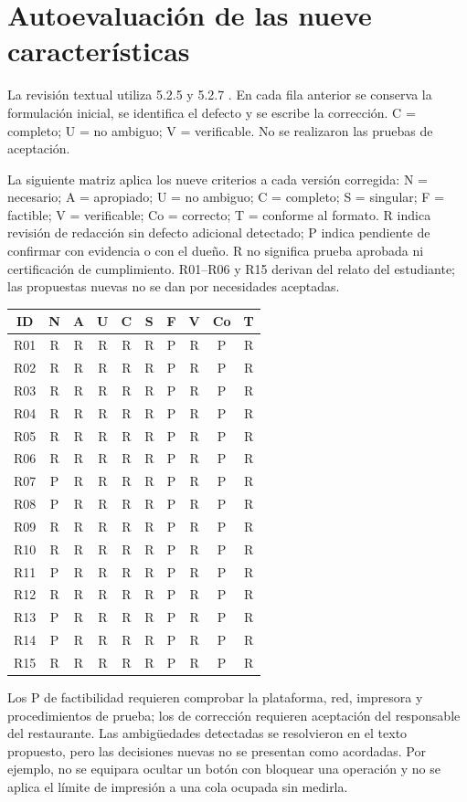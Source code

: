 \documentclass[11pt,a4paper]{article}
\begin{document}
\clearpage
\section{Autoevaluación de las nueve características}
La revisión textual utiliza 5.2.5 y 5.2.7 \cite{iso29148}. En cada fila anterior se conserva la formulación inicial, se identifica el defecto y se escribe la corrección. C = completo; U = no ambiguo; V = verificable. No se realizaron las pruebas de aceptación.

La siguiente matriz aplica los nueve criterios a cada versión corregida: N = necesario; A = apropiado; U = no ambiguo; C = completo; S = singular; F = factible; V = verificable; Co = correcto; T = conforme al formato. R indica revisión de redacción sin defecto adicional detectado; P indica pendiente de confirmar con evidencia o con el dueño. R no significa prueba aprobada ni certificación de cumplimiento. R01--R06 y R15 derivan del relato del estudiante; las propuestas nuevas no se dan por necesidades aceptadas.
\begingroup\scriptsize
\begin{longtable}{|c|c|c|c|c|c|c|c|c|c|}
\hline ID & N & A & U & C & S & F & V & Co & T \\\hline
R01 & R & R & R & R & R & P & R & P & R \\ \hline
R02 & R & R & R & R & R & P & R & P & R \\ \hline
R03 & R & R & R & R & R & P & R & P & R \\ \hline
R04 & R & R & R & R & R & P & R & P & R \\ \hline
R05 & R & R & R & R & R & P & R & P & R \\ \hline
R06 & R & R & R & R & R & P & R & P & R \\ \hline
R07 & P & R & R & R & R & P & R & P & R \\ \hline
R08 & P & R & R & R & R & P & R & P & R \\ \hline
R09 & R & R & R & R & R & P & R & P & R \\ \hline
R10 & R & R & R & R & R & P & R & P & R \\ \hline
R11 & P & R & R & R & R & P & R & P & R \\ \hline
R12 & R & R & R & R & R & P & R & P & R \\ \hline
R13 & P & R & R & R & R & P & R & P & R \\ \hline
R14 & P & R & R & R & R & P & R & P & R \\ \hline
R15 & R & R & R & R & R & P & R & P & R \\ \hline
\end{longtable}
\endgroup
Los P de factibilidad requieren comprobar la plataforma, red, impresora y procedimientos de prueba; los de corrección requieren aceptación del responsable del restaurante. Las ambigüedades detectadas se resolvieron en el texto propuesto, pero las decisiones nuevas no se presentan como acordadas. Por ejemplo, no se equipara ocultar un botón con bloquear una operación y no se aplica el límite de impresión a una cola ocupada sin medirla.
\end{document}
